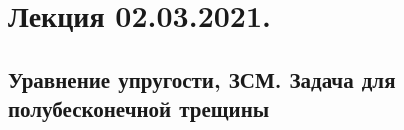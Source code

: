 \documentclass[main.tex]{subfiles}
\begin{document}

\section{Лекция 02.03.2021.}

\subsection{Уравнение упругости, ЗСМ. Задача для полубесконечной трещины}
\end{document}
